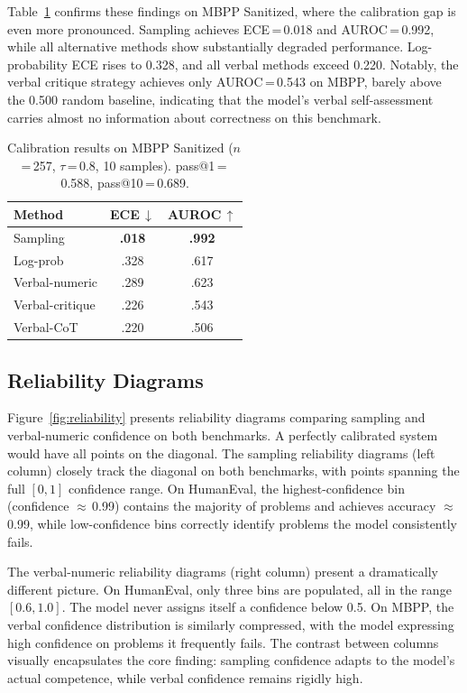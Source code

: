 \documentclass{article}
\begin{document}
Table~\ref{tab:mbpp} confirms these findings on MBPP Sanitized, where the calibration gap is even more pronounced. Sampling achieves ECE\,=\,0.018 and AUROC\,=\,0.992, while all alternative methods show substantially degraded performance. Log-probability ECE rises to 0.328, and all verbal methods exceed 0.220. Notably, the verbal critique strategy achieves only AUROC\,=\,0.543 on MBPP, barely above the 0.500 random baseline, indicating that the model's verbal self-assessment carries almost no information about correctness on this benchmark.

\begin{table}[t]
\centering
\caption{Calibration results on MBPP Sanitized ($n$\,=\,257, $\tau$\,=\,0.8, 10 samples). pass@1\,=\,0.588, pass@10\,=\,0.689.}
\label{tab:mbpp}
\small
\begin{tabular}{@{}lcc@{}}
\toprule
\textbf{Method} & \textbf{ECE\,$\downarrow$} & \textbf{AUROC\,$\uparrow$} \\
\midrule
Sampling & \textbf{.018} & \textbf{.992} \\
Log-prob & .328 & .617 \\
Verbal-numeric & .289 & .623 \\
Verbal-critique & .226 & .543 \\
Verbal-CoT & .220 & .506 \\
\bottomrule
\end{tabular}
\vspace{-0.5em}
\end{table}

\subsection{Reliability Diagrams}
\label{sec:reliability}

Figure~\ref{fig:reliability} presents reliability diagrams comparing sampling and verbal-numeric confidence on both benchmarks. A perfectly calibrated system would have all points on the diagonal. The sampling reliability diagrams (left column) closely track the diagonal on both benchmarks, with points spanning the full $[0,1]$ confidence range. On HumanEval, the highest-confidence bin (confidence $\approx$\,0.99) contains the majority of problems and achieves accuracy $\approx$\,0.99, while low-confidence bins correctly identify problems the model consistently fails.

The verbal-numeric reliability diagrams (right column) present a dramatically different picture. On HumanEval, only three bins are populated, all in the range $[0.6, 1.0]$. The model never assigns itself a confidence below 0.5. On MBPP, the verbal confidence distribution is similarly compressed, with the model expressing high confidence on problems it frequently fails. The contrast between columns visually encapsulates the core finding: sampling confidence adapts to the model's actual competence, while verbal confidence remains rigidly high.
\end{document}

